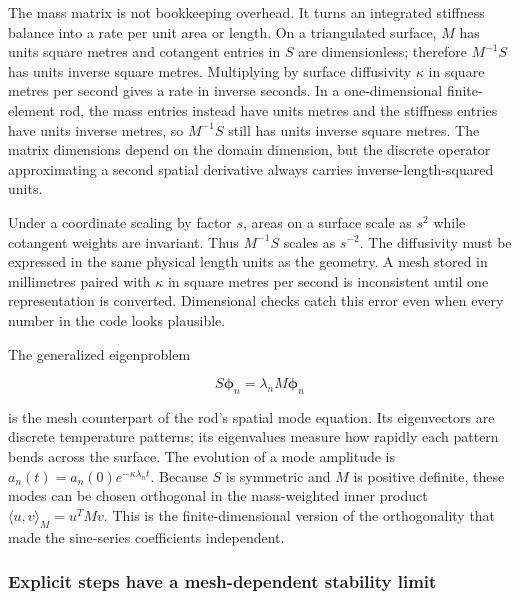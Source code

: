 The mass matrix is not bookkeeping overhead. It turns an integrated stiffness balance into a rate per unit area or length. On a triangulated surface, \(M\) has units square metres and cotangent entries in \(S\) are dimensionless; therefore \(M^{-1}S\) has units inverse square metres. Multiplying by surface diffusivity \(\kappa\) in square metres per second gives a rate in inverse seconds. In a one-dimensional finite-element rod, the mass entries instead have units metres and the stiffness entries have units inverse metres, so \(M^{-1}S\) still has units inverse square metres. The matrix dimensions depend on the domain dimension, but the discrete operator approximating a second spatial derivative always carries inverse-length-squared units.

Under a coordinate scaling by factor \(s\), areas on a surface scale as \(s^2\) while cotangent weights are invariant. Thus \(M^{-1}S\) scales as \(s^{-2}\). The diffusivity must be expressed in the same physical length units as the geometry. A mesh stored in millimetres paired with \(\kappa\) in square metres per second is inconsistent until one representation is converted. Dimensional checks catch this error even when every number in the code looks plausible.

The generalized eigenproblem

\[
S\boldsymbol\phi_n=\lambda_nM\boldsymbol\phi_n
\]

is the mesh counterpart of the rod's spatial mode equation. Its eigenvectors are discrete temperature patterns; its eigenvalues measure how rapidly each pattern bends across the surface. The evolution of a mode amplitude is \(a_n(t)=a_n(0)e^{-\kappa\lambda_nt}\). Because \(S\) is symmetric and \(M\) is positive definite, these modes can be chosen orthogonal in the mass-weighted inner product \(\langle u,v\rangle_M=u^TMv\). This is the finite-dimensional version of the orthogonality that made the sine-series coefficients independent.


\subsubsection{Explicit steps have a mesh-dependent stability limit}\label{02-foundations-ii-ch025-explicit-steps-have-a-mesh-dependent-stability-limit}

\hypertarget{02-foundations-ii-ch025-explicit-steps-have-a-mesh-dependent-stability-limit}{}


